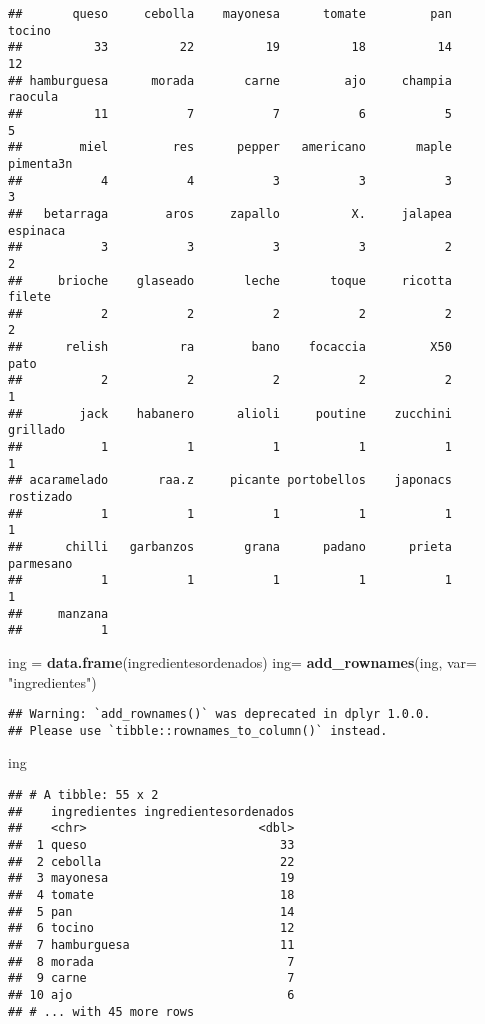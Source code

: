 \documentclass[
]{article}
\newenvironment{Shaded}{\begin{snugshade}}{\end{snugshade}}
\newcommand{\DataTypeTok}[1]{\textcolor[rgb]{0.13,0.29,0.53}{#1}}
\newcommand{\KeywordTok}[1]{\textcolor[rgb]{0.13,0.29,0.53}{\textbf{#1}}}
\newcommand{\NormalTok}[1]{#1}
\newcommand{\StringTok}[1]{\textcolor[rgb]{0.31,0.60,0.02}{#1}}
\begin{document}
\begin{verbatim}
##       queso     cebolla    mayonesa      tomate         pan      tocino 
##          33          22          19          18          14          12 
## hamburguesa      morada       carne         ajo     champia     raocula 
##          11           7           7           6           5           5 
##        miel         res      pepper   americano       maple   pimenta3n 
##           4           4           3           3           3           3 
##   betarraga        aros     zapallo          X.     jalapea    espinaca 
##           3           3           3           3           2           2 
##     brioche    glaseado       leche       toque     ricotta      filete 
##           2           2           2           2           2           2 
##      relish          ra        bano    focaccia         X50        pato 
##           2           2           2           2           2           1 
##        jack    habanero      alioli     poutine    zucchini    grillado 
##           1           1           1           1           1           1 
## acaramelado       raa.z     picante portobellos    japonacs   rostizado 
##           1           1           1           1           1           1 
##      chilli   garbanzos       grana      padano      prieta   parmesano 
##           1           1           1           1           1           1 
##     manzana 
##           1
\end{verbatim}

\begin{Shaded}
\begin{Highlighting}[]
\NormalTok{ing =}\StringTok{ }\KeywordTok{data.frame}\NormalTok{(ingredientesordenados)}
\NormalTok{ing=}\StringTok{ }\KeywordTok{add_rownames}\NormalTok{(ing, }\DataTypeTok{var=} \StringTok{"ingredientes"}\NormalTok{)}
\end{Highlighting}
\end{Shaded}

\begin{verbatim}
## Warning: `add_rownames()` was deprecated in dplyr 1.0.0.
## Please use `tibble::rownames_to_column()` instead.
\end{verbatim}

\begin{Shaded}
\begin{Highlighting}[]
\NormalTok{ing}
\end{Highlighting}
\end{Shaded}

\begin{verbatim}
## # A tibble: 55 x 2
##    ingredientes ingredientesordenados
##    <chr>                        <dbl>
##  1 queso                           33
##  2 cebolla                         22
##  3 mayonesa                        19
##  4 tomate                          18
##  5 pan                             14
##  6 tocino                          12
##  7 hamburguesa                     11
##  8 morada                           7
##  9 carne                            7
## 10 ajo                              6
## # ... with 45 more rows
\end{verbatim}
\end{document}
